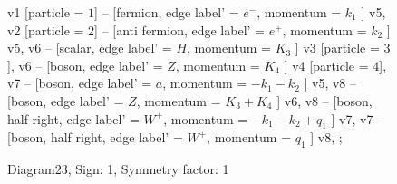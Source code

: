 \documentclass{revtex4}
\begin{document}
\begin{figure}[!htb]
\begin{center}
{    %
v1 [particle = \(1\)] -- [fermion, edge label' = \(e^{-}\), momentum = \(k_{1}\) ] v5, 
v2 [particle = \(2\)] -- [anti fermion, edge label' = \(e^{+}\), momentum = \(k_{2}\) ] v5, 
v6 -- [scalar, edge label' = \(H\), momentum = \(K_{3}\) ] v3 [particle = \(3\)], 
v6 -- [boson, edge label' = \(Z\), momentum = \(K_{4}\) ] v4 [particle = \(4\)], 
v7 -- [boson, edge label' = \(a\), momentum = \(-k_{1} - k_{2}\) ] v5, 
v8 -- [boson, edge label' = \(Z\), momentum = \(K_{3} + K_{4}\) ] v6, 
v8 -- [boson, half right, edge label' = \(W^{+}\), momentum = \(-k_{1} - k_{2} + q_{1}\) ] v7, 
v7 -- [boson, half right, edge label' = \(W^{+}\), momentum = \(q_{1}\) ] v8, 
};
\end{center}
\caption{Diagram23, Sign: 1, Symmetry factor: 1}
\end{figure}
\newpage
\end{document}
